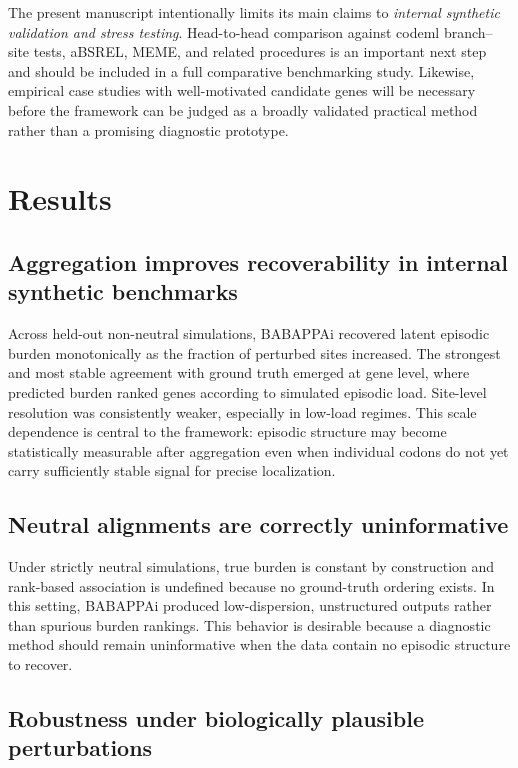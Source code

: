 \documentclass[11pt]{article}
\begin{document}
The present manuscript intentionally limits its main claims to \emph{internal synthetic validation and stress testing}. Head-to-head comparison against codeml branch--site tests, aBSREL, MEME, and related procedures is an important next step and should be included in a full comparative benchmarking study. Likewise, empirical case studies with well-motivated candidate genes will be necessary before the framework can be judged as a broadly validated practical method rather than a promising diagnostic prototype.

\section{Results}

\subsection{Aggregation improves recoverability in internal synthetic benchmarks}

Across held-out non-neutral simulations, BABAPPAi recovered latent episodic burden monotonically as the fraction of perturbed sites increased. The strongest and most stable agreement with ground truth emerged at gene level, where predicted burden ranked genes according to simulated episodic load. Site-level resolution was consistently weaker, especially in low-load regimes. This scale dependence is central to the framework: episodic structure may become statistically measurable after aggregation even when individual codons do not yet carry sufficiently stable signal for precise localization.

\subsection{Neutral alignments are correctly uninformative}

Under strictly neutral simulations, true burden is constant by construction and rank-based association is undefined because no ground-truth ordering exists. In this setting, BABAPPAi produced low-dispersion, unstructured outputs rather than spurious burden rankings. This behavior is desirable because a diagnostic method should remain uninformative when the data contain no episodic structure to recover.

\subsection{Robustness under biologically plausible perturbations}
\end{document}
